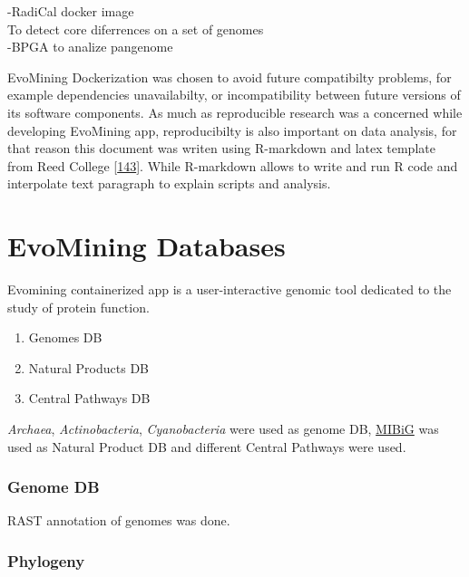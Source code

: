 \documentclass[12pt,twoside]{reedthesis}
\providecommand{\tightlist}{%
  \setlength{\itemsep}{0pt}\setlength{\parskip}{0pt}}
\begin{document}
  -RadiCal docker image\\
  To detect core diferrences on a set of genomes\\
  -BPGA to analize pangenome
  
  EvoMining Dockerization was chosen to avoid future compatibilty
  problems, for example dependencies unavailabilty, or incompatibility
  between future versions of its software components. As much as
  reproducible research was a concerned while developing EvoMining app,
  reproducibilty is also important on data analysis, for that reason this
  document was writen using R-markdown and latex template from Reed
  College {[}\protect\hyperlink{ref-chesterismay_updated_2016}{143}{]}.
  While R-markdown allows to write and run R code and interpolate text
  paragraph to explain scripts and analysis.
  
  \section{EvoMining Databases}\label{evomining-databases}
  
  Evomining containerized app is a user-interactive genomic tool dedicated
  to the study of protein function\protect\hyperlink{section}{}.
  
  \begin{enumerate}
  \def\labelenumi{\arabic{enumi}.}
  \tightlist
  \item
    Genomes DB
  \item
    Natural Products DB
  \item
    Central Pathways DB
  \end{enumerate}
  
  \emph{Archaea}, \emph{Actinobacteria}, \emph{Cyanobacteria} were used as
  genome DB, \href{http://mibig.secondarymetabolites.org/}{MIBiG} was used
  as Natural Product DB and different Central Pathways were used.
  
  \subsubsection{Genome DB}\label{genome-db}
  
  RAST annotation of genomes was done.
  
  \subsubsection{Phylogeny}\label{phylogeny}
  
\end{document}
